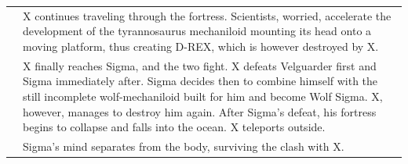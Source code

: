 \begin{tabularx}{\linewidth}{l X}
	\tabdot& X continues traveling through the fortress. Scientists, worried, accelerate the development of the tyrannosaurus mechaniloid mounting its head onto a moving platform, thus creating D-REX, which is however destroyed by X.\\
	\tabdot& X finally reaches Sigma, and the two fight. X defeats Velguarder first and Sigma immediately after. Sigma decides then to combine himself with the still incomplete wolf-mechaniloid built for him and become Wolf Sigma. X, however, manages to destroy him again. After Sigma's defeat, his fortress begins to collapse and falls into the ocean. X teleports outside.\\
	\tabdot& Sigma's mind separates from the body, surviving the clash with X.\\
	\midrule
	

\end{tabularx}
